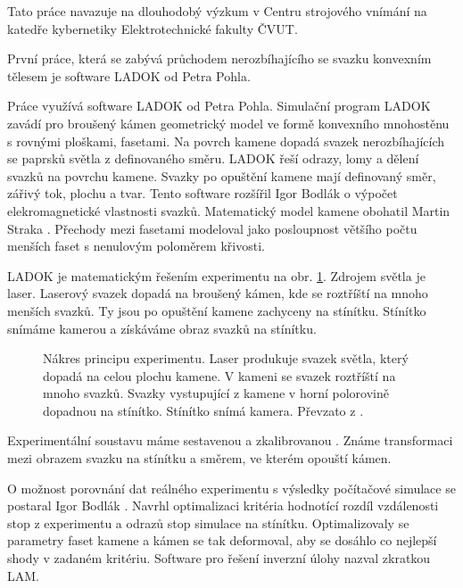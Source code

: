 Tato práce navazuje na dlouhodobý výzkum v Centru strojového vnímání na katedře kybernetiky Elektrotechnické fakulty ČVUT. 


První práce, která se zabývá průchodem nerozbíhajícího se svazku konvexním tělesem je software LADOK \cite{Pohl2002} od Petra Pohla.  

Práce využívá software LADOK \cite{Pohl2002} od Petra Pohla. Simulační program LADOK zavádí pro broušený kámen geometrický model ve formě konvexního mnohostěnu s rovnými ploškami, fasetami. Na povrch kamene dopadá svazek nerozbíhajících se paprsků světla z definovaného směru. LADOK řeší odrazy, lomy a dělení svazků na povrchu kamene. Svazky po opuštění kamene mají definovaný směr, zářivý tok, plochu a tvar. Tento software rozšířil Igor Bodlák \cite{bodlakLADOK} o výpočet elekromagnetické vlastnosti svazků. Matematický model kamene obohatil Martin Straka \cite{strakaLADOK}. Přechody mezi fasetami modeloval jako posloupnost většího počtu menších faset s nenulovým poloměrem křivosti. 

LADOK je matematickým řešením experimentu na obr. \ref{fig:basicMeasure}. Zdrojem světla je laser. Laserový svazek dopadá na broušený kámen, kde se roztříští na mnoho menších svazků. Ty jsou po opuštění kamene zachyceny na stínítku. Stínítko snímáme kamerou a získáváme obraz svazků na stínítku.  


\begin{figure}[h!]
\begin{center}
\scalebox{0.5}{ }
\end{center}
\caption{Nákres principu experimentu. Laser produkuje svazek světla, který dopadá na celou plochu kamene. V kameni se svazek roztříští na mnoho svazků. Svazky vystupující z kamene v horní polorovině dopadnou na stínítko. Stínítko snímá kamera. Převzato z \cite{Drapela}.}
\label{fig:basicMeasure}
\end{figure}


Experimentální soustavu máme sestavenou a zkalibrovanou \cite{Drapela}. Známe transformaci mezi obrazem svazku na stínítku a směrem, ve kterém opouští kámen. 

O možnost porovnání dat reálného experimentu s výsledky počítačové simulace se postaral Igor Bodlák \cite{Bodlak2005}. Navrhl optimalizaci kritéria hodnotící rozdíl vzdálenosti stop z experimentu a odrazů stop simulace na stínítku. Optimalizovaly se parametry faset kamene a kámen se tak deformoval, aby se dosáhlo co nejlepší shody v zadaném kritériu. Software pro řešení inverzní úlohy nazval zkratkou LAM. 

